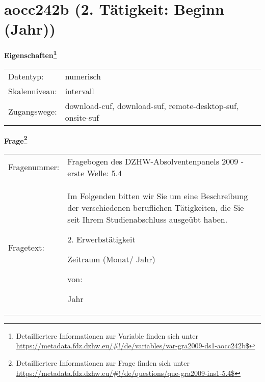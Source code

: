 
    \setcounter{footnote}{0}

    \vspace*{-1.8cm}
	\section{aocc242b (2. Tätigkeit: Beginn (Jahr))}
	\label{section:aocc242b}



    \vspace*{0.5cm}
    \noindent\textbf{Eigenschaften\footnote{Detailliertere Informationen zur Variable finden sich unter
		\url{https://metadata.fdz.dzhw.eu/\#!/de/variables/var-gra2009-ds1-aocc242b$}}}\\
	\begin{tabularx}{\hsize}{@{}lX}
	Datentyp: & numerisch \\
	Skalenniveau: & intervall \\
	Zugangswege: &
	  download-cuf, 
	  download-suf, 
	  remote-desktop-suf, 
	  onsite-suf
 \\
    \end{tabularx}



				\vspace*{0.5cm}
                \noindent\textbf{Frage\footnote{Detailliertere Informationen zur Frage finden sich unter
		              \url{https://metadata.fdz.dzhw.eu/\#!/de/questions/que-gra2009-ins1-5.4$}}}\\
				\begin{tabularx}{\hsize}{@{}lX}
					Fragenummer: &
					  Fragebogen des DZHW-Absolventenpanels 2009 - erste Welle:
					  5.4
 \\
					Fragetext: & Im Folgenden bitten wir Sie um eine Beschreibung der verschiedenen beruflichen Tätigkeiten, die Sie seit Ihrem Studienabschluss ausgeübt haben.\par  2. Erwerbstätigkeit\par  Zeitraum (Monat/ Jahr)\par  von:\par  Jahr \\
				\end{tabularx}





